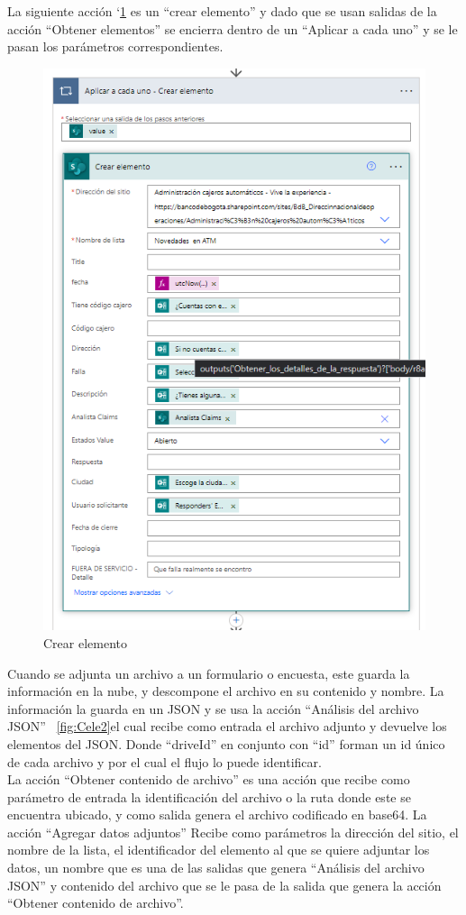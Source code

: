 La siguiente acción `\ref{fig:Cele} es un ``crear elemento'' y dado que se usan salidas de la acción ``Obtener elementos'' se encierra dentro de un ``Aplicar a cada uno'' y se le pasan los parámetros correspondientes.

\begin{figure}[H]
	\centering
	\includegraphics[scale=0.5]{Capitulo3/imagenes/flujo10.png}
	\caption{Crear elemento}
	\label{fig:Cele}
\end{figure}

Cuando se adjunta un archivo a un formulario o encuesta, este guarda la información en la nube, y descompone el archivo en su contenido y nombre. La información la guarda en un JSON y se usa la acción ``Análisis del archivo JSON'' ~\ref{fig:Cele2}el cual recibe como entrada el archivo adjunto y devuelve los elementos del JSON. Donde ``driveId'' en conjunto con ``id'' forman un id único de cada archivo y por el cual el flujo lo puede identificar.
\\
La acción ``Obtener contenido de archivo'' es una acción que recibe como parámetro de entrada la identificación del archivo o la ruta donde este se encuentra ubicado, y como salida genera el archivo codificado en base64. La acción ``Agregar datos adjuntos'' Recibe como parámetros la dirección del sitio, el nombre de la lista, el identificador del elemento al que se quiere adjuntar los datos, un nombre que es una de las salidas que genera ``Análisis del archivo JSON'' y contenido del archivo que se le pasa de la salida que genera la acción ``Obtener contenido de archivo''.

